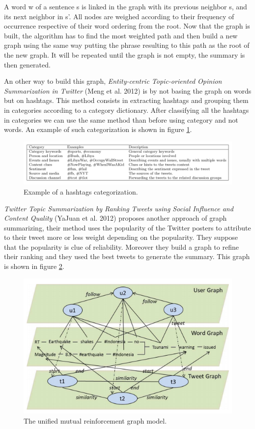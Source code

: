 \documentclass[runningheads]{llncs}
\begin{document}
A word w of a sentence s is linked in the graph with its previous neighbor s,
and its next neighbor in s'. All nodes are weighed according to their frequency
of occurrence respective of their word ordering from the root. Now that the
graph is built, the algorithm has to find the most weighted path and then build
a new graph using the same way putting the phrase resulting to this path as the
root of the new graph. It will be repeated until the graph is not empty, the
summary is then generated.

An other way to build this graph, \textit{Entity-centric Topic-oriented Opinion
Summarization in Twitter} (Meng et al. 2012) \cite{meng_entity-centric_2012} is
by not basing the graph on words but on hashtags. This method consists in
extracting hashtags and grouping them in categories according to a category
dictionary. After classifying all the hashtags in categories we can use the
same method than before using category and not words. An example of such
categorization is shown in figure \ref{fig:fig2}.

\begin{figure}[H]
    \includegraphics[width=\textwidth]{fig2.png}
    \caption{Example of a hashtags categorization.}
    \label{fig:fig2}
\end{figure}

\textit{Twitter Topic Summarization by Ranking Tweets using Social Influence
and Content Quality} (YaJuan et al. 2012) \cite{duan_twitter_2012} proposes
another approach of graph summarizing, their method uses the popularity of the
Twitter posters to attribute to their tweet more or less weight depending on
the popularity. They suppose that the popularity is clue of reliability.
Moreover they build a graph to refine their ranking and they used the best
tweets to generate the summary. This graph is shown in figure \ref{fig:fig3}.

\begin{figure}[H]
    \includegraphics[width=\textwidth]{fig3.png}
    \caption{The unified mutual reinforcement graph model.}
    \label{fig:fig3}
\end{figure}
\end{document}

